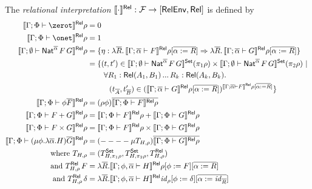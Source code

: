 \documentclass{lmcs}
\theoremstyle{plain}\newtheorem{satz}[thm]{Satz}
\newcommand{\F}{\mathcal{F}}
\newcommand{\set}{\mathsf{Set}}
\renewcommand{\id}{\mathit{id}}
\begin{document}
{\begin{defi}\label{def:rel-sem}
The {\em relational interpretation} $\relsem{\cdot} : \F \to [\relenv,
 \rel]$ is defined by
\begin{align*}
  \relsem{\Gamma;\Phi \vdash \zerot}\rho &= 0\\
  \relsem{\Gamma;\Phi \vdash \onet}\rho &= 1\\
  \relsem{\Gamma; \emptyset \vdash \Nat^{\ol{\alpha}} \,F\,G}\rho &= \{\eta
  : \lambda \ol{R}.\,\relsem{\Gamma; \ol{\alpha} \vdash
    F}\rho[\ol{\alpha := R}] \Rightarrow \lambda \ol{R}. \,\relsem{
    \Gamma; \ol{\alpha} \vdash G}\rho[\ol{\alpha := R}]\}\\
  &=
  \{(t,t') \in \setsem{\Gamma; \emptyset
    \vdash \Nat^{\ol{\alpha}}
    \,F\,G} (\pi_1 \rho) \times \setsem{ 
    \Gamma;\emptyset
    \vdash \Nat^{\ol{\alpha}} \,F\,G} (\pi_2
  \rho)~|~\\ 
  & \hspace{0.3in} \forall {R_1 : \rel(A_1,B_1)}\,...\,{R_k : \rel(A_k,B_k)}.\\
  & \hspace{0.4in} (t_{\ol{A}},t'_{\ol{B}}) \in
  (\relsem{\Gamma; \ol{\alpha} \vdash G}\rho[\ol{\alpha :=
      R}])^{\relsem{\Gamma;\ol{\alpha}\vdash F}\rho[\ol{\alpha := R}]} \}\\  
  \relsem{\Gamma;\Phi \vdash \phi \ol{F}}\rho &=
  (\rho\phi)\ol{\relsem{\Gamma;\Phi \vdash 
    F}\rho}\\
  \relsem{\Gamma;\Phi \vdash F+G}\rho &=
  \relsem{\Gamma;\Phi \vdash F}\rho +
  \relsem{\Gamma;\Phi \vdash G}\rho\\
  \relsem{\Gamma;\Phi \vdash F\times G}\rho &=
  \relsem{\Gamma;\Phi \vdash F}\rho \times
  \relsem{\Gamma;\Phi \vdash G}\rho\\  
   \relsem{\Gamma;\Phi \vdash (\mu \phi.\lambda
    \ol{\alpha}. H)\ol{G}}\rho
  &= (----\mu T_{H,\rho})\ol{\relsem{\Gamma;\Phi \vdash G}\rho}\\
  \text{where }	T_{H,\rho}
    &= (T^\set_{H,\pi_1\rho}, T^\set_{H,\pi_2\rho}, T^\rel_{H,\rho}) \\
  \text{and } T^\rel_{H,\rho}\,F
    &= \lambda \ol{R}. \relsem{
      \Gamma;\phi,\ol{\alpha} \vdash H}\rho[\phi :=
    F][\ol{\alpha := R}]\\
  \text{and } T^\rel_{H,\rho}\,\delta
    &= \lambda \ol{R}. \relsem{
      \Gamma;\phi,\ol{\alpha} \vdash H}\id_\rho[\phi :=
    \delta][\ol{\alpha := \id_{\ol{R}}}]
\end{align*}
\end{defi}

}
\end{document}
